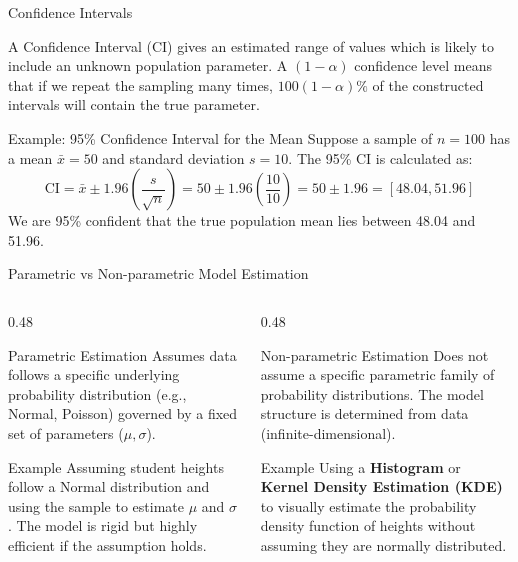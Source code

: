 \documentclass[10pt, aspectratio=169]{beamer}
\begin{document}
\begin{frame}{Confidence Intervals}
    \begin{definition}
        A Confidence Interval (CI) gives an estimated range of values which is likely to include an unknown population parameter. A $(1-\alpha)$ confidence level means that if we repeat the sampling many times, $100(1-\alpha)\%$ of the constructed intervals will contain the true parameter.
    \end{definition}

    \begin{exampleblock}{Example: 95\% Confidence Interval for the Mean}
        Suppose a sample of $n=100$ has a mean $\bar{x} = 50$ and standard deviation $s = 10$. The 95\% CI is calculated as:
        $$\text{CI} = \bar{x} \pm 1.96 \left( \frac{s}{\sqrt{n}} \right) = 50 \pm 1.96 \left( \frac{10}{10} \right) = 50 \pm 1.96 = [48.04, 51.96]$$
        We are 95\% confident that the true population mean lies between 48.04 and 51.96.
    \end{exampleblock}
\end{frame}

\begin{frame}{Parametric vs Non-parametric Model Estimation}
    \begin{columns}[T]
        \begin{column}{0.48\textwidth}
            \begin{block}{Parametric Estimation}
                Assumes data follows a specific underlying probability distribution (e.g., Normal, Poisson) governed by a fixed set of parameters ($\mu, \sigma$).
            \end{block}
            \begin{exampleblock}{Example}
                Assuming student heights follow a Normal distribution and using the sample to estimate $\mu$ and $\sigma$. The model is rigid but highly efficient if the assumption holds.
            \end{exampleblock}
        \end{column}
        
        \begin{column}{0.48\textwidth}
            \begin{block}{Non-parametric Estimation}
                Does not assume a specific parametric family of probability distributions. The model structure is determined from data (infinite-dimensional).
            \end{block}
            \begin{exampleblock}{Example}
                Using a \textbf{Histogram} or \textbf{Kernel Density Estimation (KDE)} to visually estimate the probability density function of heights without assuming they are normally distributed.
            \end{exampleblock}
        \end{column}
    \end{columns}
\end{frame}
\end{document}
